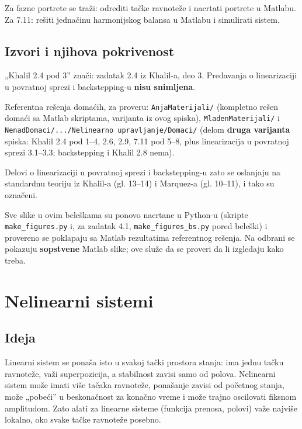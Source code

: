 \documentclass[11pt,a4paper,parskip=half,headsepline,numbers=noenddot]{scrartcl}
\begin{document}
Za fazne portrete se traži: odrediti tačke ravnoteže i nacrtati portrete u Matlabu. Za 7.11: rešiti jednačinu harmonijskog balansa u Matlabu i simulirati sistem.

\subsection{Izvori i njihova pokrivenost}

„Khalil 2.4 pod 3'' znači: zadatak 2.4 iz Khalil-a, deo 3. Predavanja o linearizaciji u povratnoj sprezi i backstepping-u \textbf{nisu snimljena}.

Referentna rešenja domaćih, za proveru: \texttt{AnjaMaterijali/\allowbreak{}} (kompletno rešen domaći sa Matlab skriptama, varijanta iz ovog spiska), \texttt{MladenMaterijali/\allowbreak{}} i \texttt{NenadDomaci/\allowbreak{}.../\allowbreak{}Nelinearno\ upravljanje/\allowbreak{}Domaci/\allowbreak{}} (delom \textbf{druga varijanta} spiska: Khalil 2.4 pod 1--4, 2.6, 2.9, 7.11 pod 5--8, plus linearizacija u povratnoj sprezi 3.1--3.3; backstepping i Khalil 2.8 nema).

Delovi o linearizaciji u povratnoj sprezi i backstepping-u zato se oslanjaju na standardnu teoriju iz Khalil-a (gl. 13--14) i Marquez-a (gl. 10--11), i tako su označeni.

Sve slike u ovim beleškama su ponovo nacrtane u Python-u (skripte \texttt{make\_\allowbreak{}figures.py} i, za zadatak 4.1, \texttt{make\_\allowbreak{}figures\_\allowbreak{}bs.py} pored beleški) i provereno se poklapaju sa Matlab rezultatima referentnog rešenja. Na odbrani se pokazuju \textbf{sopstvene} Matlab slike; ove služe da se proveri da li izgledaju kako treba.

\section{Nelinearni sistemi}

\subsection{Ideja}

Linearni sistem se ponaša isto u svakoj tački prostora stanja: ima jednu tačku ravnoteže, važi superpozicija, a stabilnost zavisi samo od polova. Nelinearni sistem može imati više tačaka ravnoteže, ponašanje zavisi od početnog stanja, može „pobeći'' u beskonačnost za konačno vreme i može trajno oscilovati fiksnom amplitudom. Zato alati za linearne sisteme (funkcija prenosa, polovi) važe najviše lokalno, oko svake tačke ravnoteže posebno.
\end{document}
